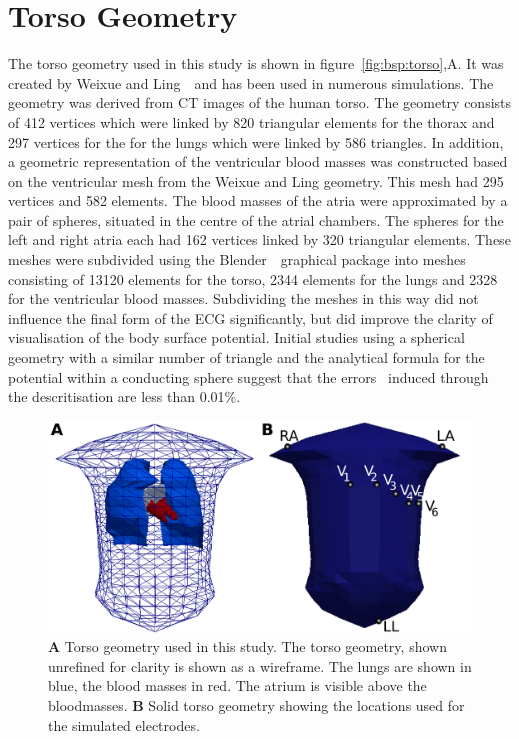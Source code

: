 \section{Torso Geometry}

The torso geometry used in this study is shown in figure~\ref{fig:bsp:torso},A.
It was created by Weixue and Ling~\cite{Lu1993,Weixue1996}\ and has been
used in numerous simulations.
The geometry was derived from CT images of the human torso.
The geometry consists of 412 vertices which were linked by 820 triangular
elements for the thorax and 297 vertices for the for the lungs which were linked
by 586 triangles.
In addition, a geometric representation of the ventricular blood masses was
constructed based on the ventricular mesh from the Weixue and Ling geometry.
This mesh had 295 vertices and 582 elements.
The blood masses of the atria were approximated by a pair of spheres, situated
in the centre of the atrial chambers.
The spheres for the left and right atria each had 162 vertices linked by 320
triangular elements.
These meshes were subdivided using the Blender~\cite{Blender}\ graphical package
into meshes consisting of 13120 elements for the torso, 2344 elements for the
lungs and 2328 for the ventricular blood masses.
Subdividing the meshes in this way did not influence the final form of the ECG
significantly, but did improve the clarity of visualisation of the body surface
potential.
Initial studies using a spherical geometry with a similar number of triangle and
the analytical formula for the potential within a conducting sphere suggest that
the errors~\cite{Ferguson1997} induced through the descritisation are less
than 0.01\%.

\begin{figure}
\includegraphics{figures/bsp/thorax_layout}
\caption[Torso showing embedded atrium and lead locations]{
\label{bsp:fig:torso}
\textbf{A} Torso geometry used in this study.
The torso geometry, shown unrefined for clarity is shown as a wireframe.
The lungs are shown in blue, the blood masses in red.
The atrium is visible above the bloodmasses.
\textbf{B} Solid torso geometry showing the locations used for the simulated
electrodes.
}
\end{figure}

